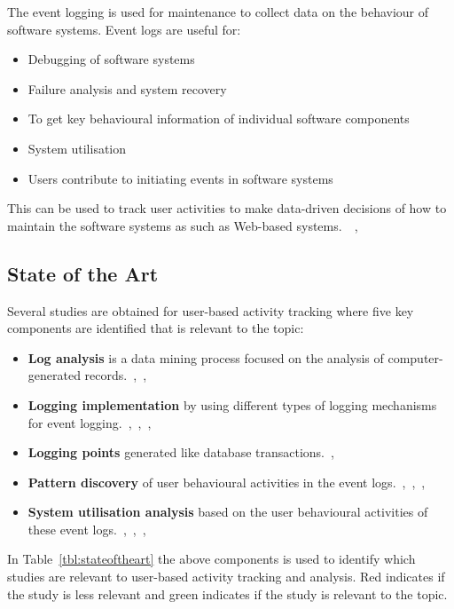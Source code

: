 The event logging is used for maintenance to collect data on the behaviour of
software systems. Event logs are useful for:~\cite{Park2017}
\begin{itemize}
    \item Debugging of software systems
    \item Failure analysis and system recovery
    \item To get key behavioural information of individual software components
    \item System utilisation
    \item Users contribute to initiating events in software systems
\end{itemize}
This can be used to track user activities to make data-driven decisions of how
to maintain the software systems as such as Web-based
systems.~\cite{Rong2018}~\cite{Razavi2008},~\cite{Lei2018}

\newpage
\subsection{State of the Art}\label{sec:stateofart}

Several studies are obtained for user-based activity tracking where
five key components are identified that is relevant to the topic:

\begin{itemize}
    \item \textbf{Log analysis} is a data mining process focused on the analysis of computer-generated records.~\cite{Vaarandi2015},~\cite{Pecchia2015},~\cite{Song2008}
    \item \textbf{Logging implementation} by using different types of logging mechanisms for event logging.~\cite{Potey2013},~\cite{Rong2018},~\cite{Rong2018a},~\cite{Tian2017}
    \item \textbf{Logging points} generated like database transactions.~\cite{Potey2013},~\cite{Li2018}
    \item \textbf{Pattern discovery} of user behavioural activities in the event logs.~\cite{Dhanalakshmi2016},~\cite{Slaninova2014},~\cite{Lu2019},~\cite{Port2017}
    \item \textbf{System utilisation analysis} based on the user behavioural activities of these event logs.~\cite{Park2017},~\cite{Slaninova2014},~\cite{Lu2019},~\cite{Chen2019}
\end{itemize}

In Table~\ref{tbl:stateoftheart} the above components is used to identify which
studies are relevant to user-based activity tracking and analysis. Red indicates
if the study is less relevant and green indicates if the study is relevant to
the topic.

